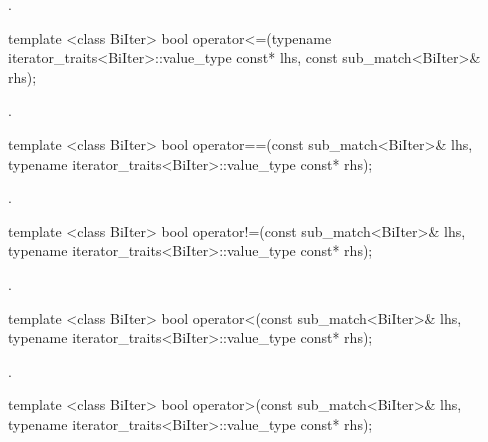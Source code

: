 \begin{itemdescr}
\pnum\returns {}.
\end{itemdescr}

%
\begin{itemdecl}
template <class BiIter> 
  bool operator<=(typename iterator_traits<BiIter>::value_type const* lhs, 
                  const sub_match<BiIter>& rhs); 
\end{itemdecl}

\begin{itemdescr}
\pnum\returns {}.
\end{itemdescr}

%
\begin{itemdecl}
template <class BiIter> 
  bool operator==(const sub_match<BiIter>& lhs, 
                  typename iterator_traits<BiIter>::value_type const* rhs);
\end{itemdecl}

\begin{itemdescr}
\pnum\returns {}.
\end{itemdescr}

%
\begin{itemdecl}
template <class BiIter> 
  bool operator!=(const sub_match<BiIter>& lhs, 
                  typename iterator_traits<BiIter>::value_type const* rhs); 
\end{itemdecl}

\begin{itemdescr}
\pnum\returns {}.
\end{itemdescr}

%
\begin{itemdecl}
template <class BiIter> 
  bool operator<(const sub_match<BiIter>& lhs, 
                 typename iterator_traits<BiIter>::value_type const* rhs); 
\end{itemdecl}

\begin{itemdescr}
\pnum\returns {}.
\end{itemdescr}

%
\begin{itemdecl}
template <class BiIter> 
  bool operator>(const sub_match<BiIter>& lhs, 
                 typename iterator_traits<BiIter>::value_type const* rhs); 
\end{itemdecl}


